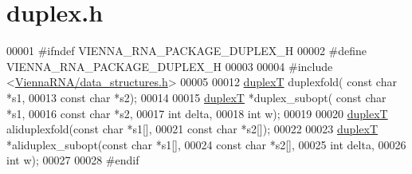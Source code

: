 \hypertarget{duplex_8h_source}{}\section{duplex.\+h}
\label{duplex_8h_source}

\begin{DoxyCode}
00001 \textcolor{preprocessor}{#ifndef VIENNA\_RNA\_PACKAGE\_DUPLEX\_H}
00002 \textcolor{preprocessor}{#define VIENNA\_RNA\_PACKAGE\_DUPLEX\_H}
00003 
00004 \textcolor{preprocessor}{#include <\hyperlink{data__structures_8h}{ViennaRNA/data\_structures.h}>}
00005 
00012 \hyperlink{group__data__structures_structduplexT}{duplexT} duplexfold( \textcolor{keyword}{const} \textcolor{keywordtype}{char} *s1,
00013                     \textcolor{keyword}{const} \textcolor{keywordtype}{char} *s2);
00014 
00015 \hyperlink{group__data__structures_structduplexT}{duplexT} *duplex\_subopt( \textcolor{keyword}{const} \textcolor{keywordtype}{char} *s1,
00016                         \textcolor{keyword}{const} \textcolor{keywordtype}{char} *s2,
00017                         \textcolor{keywordtype}{int} delta,
00018                         \textcolor{keywordtype}{int} w);
00019 
00020 \hyperlink{group__data__structures_structduplexT}{duplexT} aliduplexfold(\textcolor{keyword}{const} \textcolor{keywordtype}{char} *s1[],
00021                       \textcolor{keyword}{const} \textcolor{keywordtype}{char} *s2[]);
00022 
00023 \hyperlink{group__data__structures_structduplexT}{duplexT} *aliduplex\_subopt(\textcolor{keyword}{const} \textcolor{keywordtype}{char} *s1[],
00024                           \textcolor{keyword}{const} \textcolor{keywordtype}{char} *s2[],
00025                           \textcolor{keywordtype}{int} delta,
00026                           \textcolor{keywordtype}{int} w);
00027 
00028 \textcolor{preprocessor}{#endif}
\end{DoxyCode}
